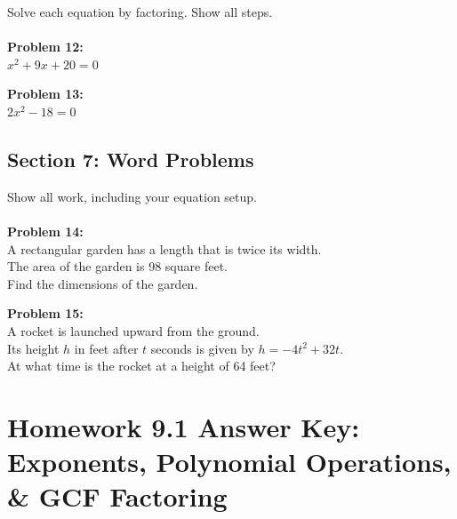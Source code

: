 \documentclass[12pt]{article}
\begin{document}
            Solve each equation by factoring. Show all steps.\\\\
            
            \textbf{Problem 12:}\\
            
            $x^2 + 9x + 20 = 0$
            
            \vspace{4cm}
            
            \textbf{Problem 13:}\\
            
            $2x^2 - 18 = 0$
            
            \newpage

        \subsection*{Section 7: Word Problems}
            
            Show all work, including your equation setup.\\\\
            
            \textbf{Problem 14:}\\
            
            A rectangular garden has a length that is twice its width.\\
            
            The area of the garden is 98 square feet.\\
            
            Find the dimensions of the garden.\\
            
            \vspace{6cm}
            
            \textbf{Problem 15:}\\
            
            A rocket is launched upward from the ground.\\
            
            Its height $h$ in feet after $t$ seconds is given by $h = -4t^2 + 32t$.\\
            
            At what time is the rocket at a height of 64 feet?

            \newpage

	\section*{Homework 9.1 Answer Key: \\ Exponents, Polynomial Operations, \& GCF Factoring}
\end{document}
